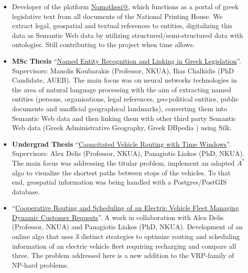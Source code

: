 \documentclass[a4paper,oneside,10pt]{article}
\begin{document}
\begin{itemize}

\item Developer of the platform \href{http://legislation.di.uoa.gr/}{Nomothesi@}, which functions as a portal of greek legislative text from all documents of the National Printing House. We extract legal, geospatial and textual references to entities, digitalizing this data as Semantic Web data by utilizing structured/semi-structured data with ontologies. Still contributing to the project when time allows.

\item \begin{sloppypar}
\textbf{MSc Thesis} ``\href{https://pergamos.lib.uoa.gr/uoa/dl/frontend/en/browse/2766525}{Named Entity Recognition and Linking in Greek Legislation}''. Supervisors: Manolis Koubarakis (Professor, NKUA), Ilias Chalkidis (PhD Candidate, AUEB).
The main focus was on neural networks technologies in the area of natural language processing with the aim of extracting named entities (persons, organisations, legal references, geo-political entities, public documents and unofficial geographical landmarks), 
converting them into Semantic Web data and then linking them with other third party Semantic Web data (Greek Administrative Geography, Greek DBpedia ) using Silk.

\end{sloppypar}

\item \begin{sloppypar}
\textbf{Undergrad Thesis} ``\href{http://efessos.lib.uoa.gr/applications/disserts.nsf/0f1ab5fee83fbb88c225770c0042ce4f/8da6d56136caaacec2257ea6004c9349?OpenDocument}{Capacitated Vehicle Routing with Time Windows}''. Supervisors: Alex Delis (Professor, NKUA), Panagiotis Liakos (PhD, NKUA). 
The main focus was addressing the titular problem, implement an adapted $A^{*}$ algo to visualize the shortest paths between stops of the vehicles. To that end, geospatial information was being handled with a Postgres/PostGIS database.

\end{sloppypar}

\item \begin{sloppypar}
``\href{https://bitbucket.org/Metimdjai/vrppd/src/master/}{Cooperative Routing and Scheduling of an Electric Vehicle Fleet Managing Dynamic Customer Requests}''. A work in collaboration with Alex Delis (Professor, NKUA) and Panagiotis Liakos (PhD, NKUA). 
Development of an online algo that uses 3 distinct strategies to optimize routing and scheduling information of an electric vehicle fleet requiring recharging and compare all three. The problem addressed here is a new addition to the VRP-family of NP-hard problems.


\end{sloppypar}
\end{itemize}
\end{document}
